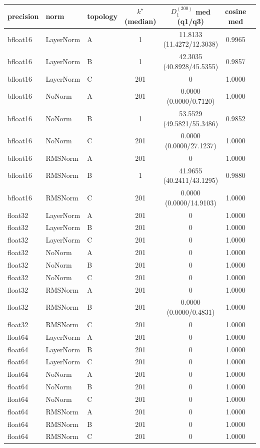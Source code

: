 \begin{tabular}{l l l c c c c}
\toprule
precision & norm & topology & $k^\star$ (median) & $D_1^{(200)}$ med (q1/q3) & cosine med \\
\midrule
bfloat16 & LayerNorm & A & 1 & 11.8133 (11.4272/12.3038) & 0.9965 \\
bfloat16 & LayerNorm & B & 1 & 42.3035 (40.8928/45.5355) & 0.9857 \\
bfloat16 & LayerNorm & C & 201 & 0 & 1.0000 \\
bfloat16 & NoNorm & A & 201 & 0.0000 (0.0000/0.7120) & 1.0000 \\
bfloat16 & NoNorm & B & 1 & 53.5529 (49.5821/55.3486) & 0.9852 \\
bfloat16 & NoNorm & C & 201 & 0.0000 (0.0000/27.1237) & 1.0000 \\
bfloat16 & RMSNorm & A & 201 & 0 & 1.0000 \\
bfloat16 & RMSNorm & B & 1 & 41.9655 (40.2411/43.1295) & 0.9880 \\
bfloat16 & RMSNorm & C & 201 & 0.0000 (0.0000/14.9103) & 1.0000 \\
float32 & LayerNorm & A & 201 & 0 & 1.0000 \\
float32 & LayerNorm & B & 201 & 0 & 1.0000 \\
float32 & LayerNorm & C & 201 & 0 & 1.0000 \\
float32 & NoNorm & A & 201 & 0 & 1.0000 \\
float32 & NoNorm & B & 201 & 0 & 1.0000 \\
float32 & NoNorm & C & 201 & 0 & 1.0000 \\
float32 & RMSNorm & A & 201 & 0 & 1.0000 \\
float32 & RMSNorm & B & 201 & 0.0000 (0.0000/0.4831) & 1.0000 \\
float32 & RMSNorm & C & 201 & 0 & 1.0000 \\
float64 & LayerNorm & A & 201 & 0 & 1.0000 \\
float64 & LayerNorm & B & 201 & 0 & 1.0000 \\
float64 & LayerNorm & C & 201 & 0 & 1.0000 \\
float64 & NoNorm & A & 201 & 0 & 1.0000 \\
float64 & NoNorm & B & 201 & 0 & 1.0000 \\
float64 & NoNorm & C & 201 & 0 & 1.0000 \\
float64 & RMSNorm & A & 201 & 0 & 1.0000 \\
float64 & RMSNorm & B & 201 & 0 & 1.0000 \\
float64 & RMSNorm & C & 201 & 0 & 1.0000 \\
\bottomrule
\end{tabular}
